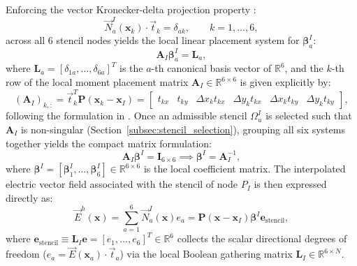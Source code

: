 \documentclass[preprint,12pt]{elsarticle}
\begin{document}
Enforcing the vector Kronecker-delta projection property \cite{stable_vnmm2d_2026}:
\begin{equation}
    \vec{N}_a^I(\mathbf{x}_k) \cdot \vec{t}_k = \delta_{ak}, \qquad k = 1, \dots, 6,
    \label{eq:kronecker_projection}
\end{equation}
across all 6 stencil nodes yields the local linear placement system for $\boldsymbol{\beta}_a^I$:
\begin{equation}
    \mathbf{A}_I \boldsymbol{\beta}_a^I = \mathbf{L}_a,
    \label{eq:collocation_system}
\end{equation}
where $\mathbf{L}_a = [\delta_{1a}, \dots, \delta_{6a}]^T$ is the $a$-th canonical basis vector of $\mathbb{R}^6$, and the $k$-th row of the local moment placement matrix $\mathbf{A}_I \in \mathbb{R}^{6 \times 6}$ is given explicitly by:
\begin{equation}
    (\mathbf{A}_I)_{k, :} = \vec{t}_k^T \mathbf{P}(\mathbf{x}_k - \mathbf{x}_I) = \begin{bmatrix} t_{kx} & t_{ky} & \Delta x_k t_{kx} & \Delta y_k t_{kx} & \Delta x_k t_{ky} & \Delta y_k t_{ky} \end{bmatrix},
    \label{eq:matrix_A_row}
\end{equation}
following the formulation in \cite{stable_vnmm2d_2026}.
Once an admissible stencil $\Omega_u^I$ is selected such that $\mathbf{A}_I$ is non-singular (Section~\ref{subsec:stencil_selection}), grouping all six systems together yields the compact matrix formulation:
\begin{equation}
    \mathbf{A}_I \boldsymbol{\beta}^I = \mathbf{I}_{6 \times 6} \implies \boldsymbol{\beta}^I = \mathbf{A}_I^{-1},
    \label{eq:beta_matrix_inversion}
\end{equation}
where $\boldsymbol{\beta}^I = [\boldsymbol{\beta}_1^I, \dots, \boldsymbol{\beta}_6^I] \in \mathbb{R}^{6 \times 6}$ is the local coefficient matrix. The interpolated electric vector field associated with the stencil of node $P_I$ is then expressed directly as:
\begin{equation}
    \vec{E}^h(\mathbf{x}) = \sum_{a=1}^6 \vec{N}_a^I(\mathbf{x}) e_a = \mathbf{P}(\mathbf{x} - \mathbf{x}_I) \boldsymbol{\beta}^I \mathbf{e}_{\mathrm{stencil}},
    \label{eq:field_interpolation_mlpg}
\end{equation}
where $\mathbf{e}_{\mathrm{stencil}} \equiv \mathbf{L}_I \mathbf{e} = [e_1, \dots, e_6]^T \in \mathbb{R}^6$ collects the scalar directional degrees of freedom ($e_a = \vec{E}(\mathbf{x}_a) \cdot \vec{t}_a$) via the local Boolean gathering matrix $\mathbf{L}_I \in \mathbb{R}^{6 \times N}$.
\end{document}
